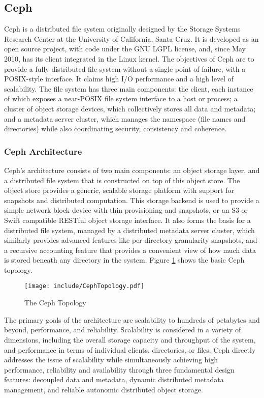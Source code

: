 \documentclass[11pt]{article}
\begin{document}
\subsection{Ceph}
Ceph is a distributed file system originally designed by the Storage 
Systems Research Center at the University of California, Santa Cruz. 
It is developed as an open source project, with code under the GNU LGPL 
license, and, since May 2010, has its client integrated in the Linux 
kernel. The objectives of Ceph are to provide a fully distributed file 
system without a single point of failure, with a POSIX-style interface. 
It claims high I/O performance and a high level of scalability. The 
file system has three main components: the client, each instance of 
which exposes a near-POSIX file system interface to a host or process; 
a cluster of object storage devices, which collectively stores all 
data and metadata; and a metadata server cluster, which manages the 
namespace (file names and directories) while also coordinating 
security, consistency and coherence.

\subsubsection{Ceph Architecture}
Ceph's architecture consists of two main components: an object storage 
layer, and a distributed file system that is constructed on top of 
this object store. The object store provides a generic, scalable 
storage platform with support for snapshots and distributed computation. 
This storage backend is used to provide a simple network block device  
with thin provisioning and snapshots, or an S3 or Swift compatible RESTful 
object storage interface. It also forms the basis for a distributed file 
system, managed by a distributed metadata server cluster, which similarly 
provides advanced features like per-directory granularity snapshots, and a 
recursive accounting feature that provides a convenient view of how much 
data is stored beneath any directory in the system. Figure
\ref{fig:CephTopology} shows the basic Ceph topology.

\begin{figure}[htbp]
  \centering
  \texttt{[image: include/CephTopology.pdf]}
  \caption{The Ceph Topology}
  \label{fig:CephTopology}
\end{figure}

The primary goals of the architecture are scalability to hundreds of 
petabytes and beyond, performance, and reliability. Scalability is 
considered in a variety of dimensions, including the overall storage 
capacity and throughput of the system, and performance in terms of 
individual clients, directories, or files. Ceph directly addresses the 
issue of scalability while simultaneously achieving high performance, 
reliability and availability through three fundamental design features: 
decoupled data and metadata, dynamic distributed metadata management, 
and reliable autonomic distributed object storage.
\end{document}
